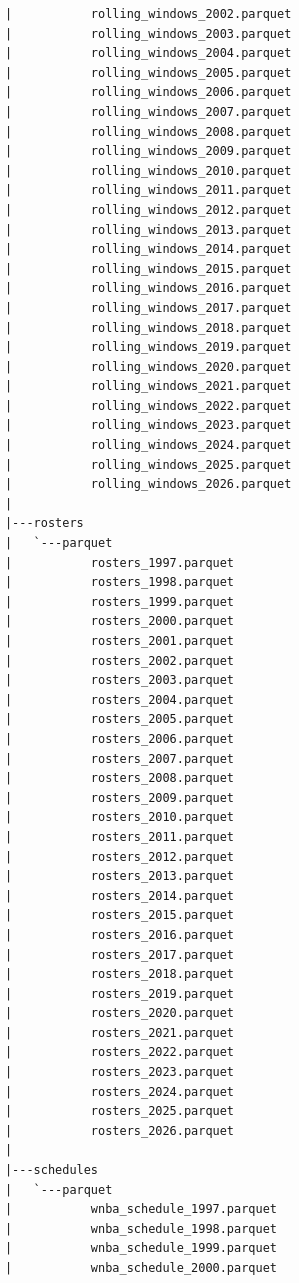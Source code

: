 \begin{lstlisting}
      |           rolling_windows_2002.parquet
      |           rolling_windows_2003.parquet
      |           rolling_windows_2004.parquet
      |           rolling_windows_2005.parquet
      |           rolling_windows_2006.parquet
      |           rolling_windows_2007.parquet
      |           rolling_windows_2008.parquet
      |           rolling_windows_2009.parquet
      |           rolling_windows_2010.parquet
      |           rolling_windows_2011.parquet
      |           rolling_windows_2012.parquet
      |           rolling_windows_2013.parquet
      |           rolling_windows_2014.parquet
      |           rolling_windows_2015.parquet
      |           rolling_windows_2016.parquet
      |           rolling_windows_2017.parquet
      |           rolling_windows_2018.parquet
      |           rolling_windows_2019.parquet
      |           rolling_windows_2020.parquet
      |           rolling_windows_2021.parquet
      |           rolling_windows_2022.parquet
      |           rolling_windows_2023.parquet
      |           rolling_windows_2024.parquet
      |           rolling_windows_2025.parquet
      |           rolling_windows_2026.parquet
      |
      |---rosters
      |   `---parquet
      |           rosters_1997.parquet
      |           rosters_1998.parquet
      |           rosters_1999.parquet
      |           rosters_2000.parquet
      |           rosters_2001.parquet
      |           rosters_2002.parquet
      |           rosters_2003.parquet
      |           rosters_2004.parquet
      |           rosters_2005.parquet
      |           rosters_2006.parquet
      |           rosters_2007.parquet
      |           rosters_2008.parquet
      |           rosters_2009.parquet
      |           rosters_2010.parquet
      |           rosters_2011.parquet
      |           rosters_2012.parquet
      |           rosters_2013.parquet
      |           rosters_2014.parquet
      |           rosters_2015.parquet
      |           rosters_2016.parquet
      |           rosters_2017.parquet
      |           rosters_2018.parquet
      |           rosters_2019.parquet
      |           rosters_2020.parquet
      |           rosters_2021.parquet
      |           rosters_2022.parquet
      |           rosters_2023.parquet
      |           rosters_2024.parquet
      |           rosters_2025.parquet
      |           rosters_2026.parquet
      |
      |---schedules
      |   `---parquet
      |           wnba_schedule_1997.parquet
      |           wnba_schedule_1998.parquet
      |           wnba_schedule_1999.parquet
      |           wnba_schedule_2000.parquet

\end{lstlisting}
